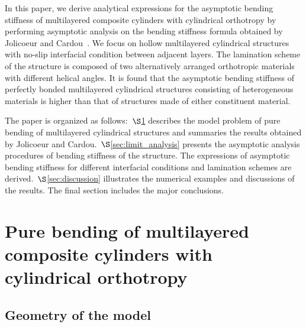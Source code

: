 \documentclass[preprint,10pt,times]{elsarticle}
\numberwithin{equation}{section}
\renewcommand{\>}{$\Rightarrow$}
\begin{document}
In this paper, we derive analytical expressions for the asymptotic bending stiffness of multilayered composite cylinders with cylindrical orthotropy by performing asymptotic analysis on the bending stiffness formula obtained by Jolicoeur and Cardou~\cite{Jolicoeur1994}.
We focus on hollow multilayered cylindrical structures with no-slip interfacial condition between adjacent layers. The lamination scheme of the structure is composed of two alternatively arranged orthotropic materials with different helical angles.
%
It is found that the asymptotic bending stiffness of perfectly bonded multilayered cylindrical structures consisting of heterogeneous materials is higher than that of structures made of either constituent material.



The paper is organized as follows:~$\S$\ref{sec:bending_model} describes the model problem of pure bending of multilayered cylindrical structures and summaries the results obtained by Jolicoeur and Cardou.~$\S$\ref{sec:limit_analysis} presents the asymptotic analysis procedures of bending stiffness of the structure. The expressions of asymptotic bending stiffness for different interfacial conditions and lamination schemes are derived.~$\S$\ref{sec:discussion} illustrates the numerical examples and discussions of the results. The final section includes the major conclusions.



\section{Pure bending of multilayered composite cylinders with cylindrical orthotropy}
\label{sec:bending_model}

\subsection{Geometry of the model}
\end{document}
